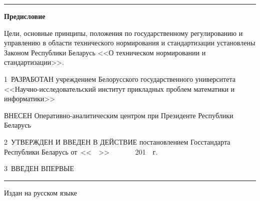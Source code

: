 \hrule 

\rule{0pt}{5mm}

\centerline{\bf Предисловие} 
Цели, основные принципы, положения по государственному регулированию и управлению в 
области технического нормирования и стандартизации установлены Законом Республики Беларусь
<<О техническом нормировании и стандартизации>>. 

\vskip0.2cm

1~РАЗРАБОТАН учреждением Белорусского государственного университета 
<<Научно-исследовательский институт прикладных проблем математики и 
информатики>>

ВНЕСЕН Оперативно-аналитическим центром при Президенте 
Республики Беларусь

2~УТВЕРЖДЕН И ВВЕДЕН В ДЕЙСТВИЕ постановлением Госстандарта Республики 
Беларусь от~<<$\phantom{\text{09}}$>> 
$\phantom{\text{января}}$~201$\phantom{\text{8}}$~г. 
\No~$\phantom{\text{9}}$ 

3~ВВЕДЕН ВПЕРВЫЕ

\vfill


\hrule
\vskip1mm
Издан на русском языке

\pagebreak
